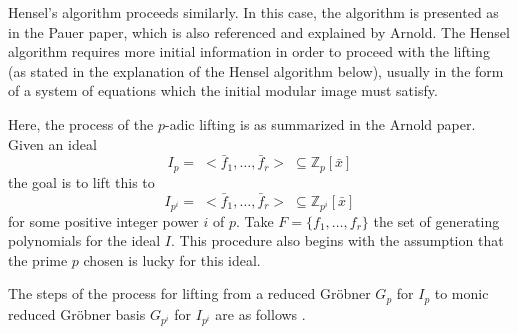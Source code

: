 \documentclass[letterpaper,12pt,titlepage,oneside,final]{book}
\begin{document}
Hensel's algorithm proceeds similarly.  In this case, the algorithm is presented as in the Pauer paper, which is also referenced and explained by Arnold.  The Hensel algorithm requires more initial information in order to proceed with the lifting (as stated in the explanation of the Hensel algorithm below), usually in the form of a system of equations which the initial modular image must satisfy.  

Here, the process of the ${p}$-adic lifting is as summarized in the Arnold paper.  Given an ideal \begin{equation*}I_{p} = \; <\bar f_1, \ldots, \bar f_r> \; \subseteq \mathbb{Z}_{p}[\bar x]\end{equation*}the goal is to lift this to \begin{equation*}I_{p^i} = \; <\bar f_1, \ldots, \bar f_r> \; \subseteq \mathbb{Z}_{p^i}[\bar x]\end{equation*}for some positive integer power ${i}$ of ${p}$.  Take ${F = \{f_1, \ldots, f_r\}}$ the set of generating polynomials for the ideal ${I}$.  This procedure also begins with the assumption that the prime ${p}$ chosen is lucky for this ideal.

The steps of the process for lifting from a reduced Gr\"obner ${G_p}$ for ${I_p}$ to monic reduced Gr\"obner basis ${G_{p^i}}$ for ${I_{p^i}}$ are as follows \cite{Arnold}.
\end{document}
